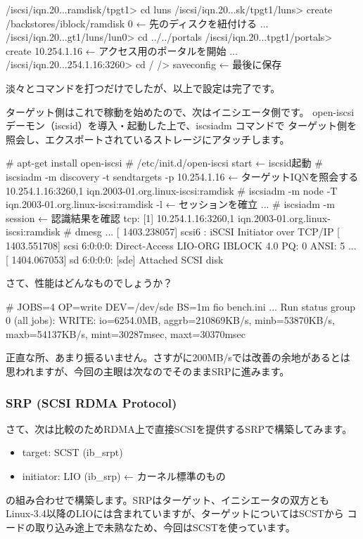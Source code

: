 \documentclass[mingoth,a4paper]{jsarticle}
\begin{document}
\begin{commandline}
/iscsi/iqn.20...ramdisk/tpgt1> cd luns
/iscsi/iqn.20...sk/tpgt1/luns> create /backstores/iblock/ramdisk 0 ← 先のディスクを紐付ける
...
/iscsi/iqn.20...gt1/luns/lun0> cd ../../portals
/iscsi/iqn.20...tpgt1/portals> create 10.254.1.16      ← アクセス用のポータルを開始
...
/iscsi/iqn.20...254.1.16:3260> cd /
/> saveconfig                                          ← 最後に保存
\end{commandline}

淡々とコマンドを打つだけでしたが、以上で設定は完了です。

ターゲット側はこれで稼動を始めたので、次はイニシエータ側です。
open-iscsiデーモン（iscsid）を導入・起動した上で、iscsiadm コマンドで
ターゲット側を照会し、エクスポートされているストレージにアタッチします。

\begin{commandline}
# apt-get install open-iscsi
# /etc/init.d/open-iscsi start                               ← iscsid起動
# iscsiadm -m discovery -t sendtargets -p 10.254.1.16        ← ターゲットIQNを照会する
10.254.1.16:3260,1 iqn.2003-01.org.linux-iscsi:ramdisk
# iscsiadm -m node -T iqn.2003-01.org.linux-iscsi:ramdisk -l ← セッションを確立
...
# iscsiadm -m session                                        ← 認識結果を確認
tcp: [1] 10.254.1.16:3260,1 iqn.2003-01.org.linux-iscsi:ramdisk
# dmesg
...
[ 1403.238057] scsi6 : iSCSI Initiator over TCP/IP
[ 1403.551708] scsi 6:0:0:0: Direct-Access     LIO-ORG  IBLOCK           4.0  PQ: 0 ANSI: 5
...
[ 1404.067053] sd 6:0:0:0: [sde] Attached SCSI disk
\end{commandline}

さて、性能はどんなものでしょうか？

\begin{commandline}
# JOBS=4 OP=write DEV=/dev/sde BS=1m fio bench.ini
...
Run status group 0 (all jobs):
  WRITE: io=6254.0MB, aggrb=210869KB/s, minb=53870KB/s, maxb=54137KB/s, mint=30287msec, maxt=30370msec
\end{commandline}

正直な所、あまり振るいません。さすがに200MB/sでは改善の余地があるとは
思われますが、今回の主眼は次なのでそのままSRPに進みます。

\subsubsection{SRP (SCSI RDMA Protocol)}
さて、次は比較のためRDMA上で直接SCSIを提供するSRPで構築してみます。
\begin{itemize}
\item target: SCST (ib\_srpt)
\item initiator: LIO (ib\_srp) ← カーネル標準のもの
\end{itemize}
の組み合わせで構築します。SRPはターゲット、イニシエータの双方とも
Linux-3.4以降のLIOには含まれていますが、ターゲットについてはSCSTから
コードの取り込み途上で未熟なため、今回はSCSTを使っています。
\end{document}
